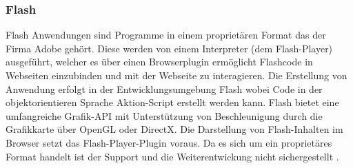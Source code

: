 \subsubsection{Flash}
\label{sec:Flash}
Flash Anwendungen sind Programme in einem proprietären Format das der Firma Adobe gehört.
Diese werden von einem Interpreter (dem Flash-Player) ausgeführt, welcher es über einen Browserplugin ermöglicht Flashcode in Webseiten einzubinden und mit der Webseite zu interagieren.
%
Die Erstellung von Anwendung erfolgt in der Entwicklungsumgebung Flash wobei Code in der objektorientieren Sprache Aktion-Script erstellt werden kann.
Flash bietet eine umfangreiche Grafik-API mit Unterstützung von Beschleunigung durch die Grafikkarte über OpenGL oder DirectX.
%
Die Darstellung von Flash-Inhalten im Browser setzt das Flash-Player-Plugin voraus.
Da es sich um ein proprietäres Format handelt ist der Support und die Weiterentwickung nicht sichergestellt \cite{flash-14}.
